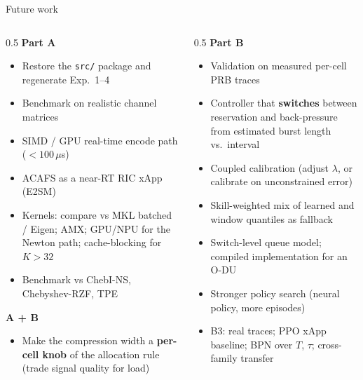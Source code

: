 \documentclass[aspectratio=169,11pt,xcolor=table]{beamer}
\begin{document}
\begin{frame}{Future work}
  \footnotesize
  \begin{columns}[T]
    \begin{column}{0.5\textwidth}
      \textbf{Part A}
      \begin{itemize}
        \item Restore the \texttt{src/} package and regenerate Exp.\ 1--4
        \item Benchmark on realistic channel matrices
        \item SIMD / GPU real-time encode path ($<100\,\mu$s)
        \item ACAFS as a near-RT RIC xApp (E2SM)
        \item Kernels: compare vs MKL batched / Eigen; AMX; GPU/NPU for the Newton path; cache-blocking for $K > 32$
        \item Benchmark vs ChebI-NS, Chebyshev-RZF, TPE
      \end{itemize}
      \textbf{A + B}
      \begin{itemize}
        \item Make the compression width a \textbf{per-cell knob} of the allocation rule (trade signal quality for load)
      \end{itemize}
    \end{column}
    \begin{column}{0.5\textwidth}
      \textbf{Part B}
      \begin{itemize}
        \item Validation on measured per-cell PRB traces
        \item Controller that \textbf{switches} between reservation and back-pressure from estimated burst length vs.\ interval
        \item Coupled calibration (adjust $\lambda$, or calibrate on unconstrained error)
        \item Skill-weighted mix of learned and window quantiles as fallback
        \item Switch-level queue model; compiled implementation for an O-DU
        \item Stronger policy search (neural policy, more episodes)
        \item B3: real traces; PPO xApp baseline; BPN over $T$, $\tau$; cross-family transfer
      \end{itemize}
    \end{column}
  \end{columns}
\end{frame}
\end{document}

